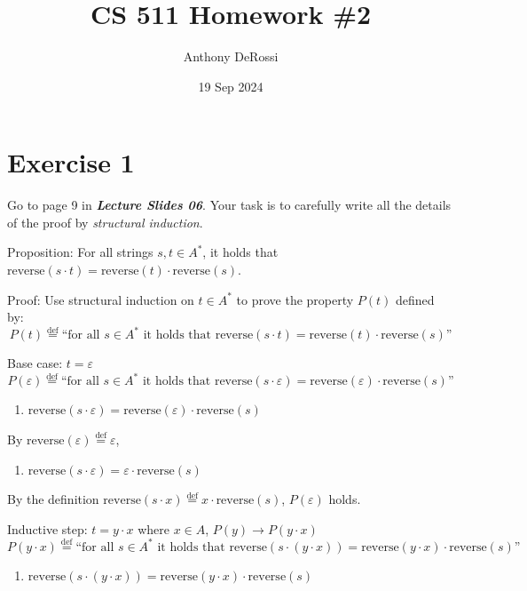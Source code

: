 \documentclass[12pt,leqno]{article}
\title{CS 511 Homework \#2}
\author{Anthony DeRossi}
\date{19 Sep 2024}
\newcommand{\DefEq}{\stackrel{\text{def}}{=}}
\begin{document}
\maketitle

\section*{Exercise 1}

Go to page 9 in \textbf{\textit{Lecture Slides 06}}. Your task is to carefully
write all the details of the proof by \textit{structural induction}.

\medskip
Proposition: For all strings $s, t \in A^*$, it holds that $\text{reverse}(s
\cdot t) = \text{reverse}(t) \cdot \text{reverse}(s)$.

Proof: Use structural induction on $t \in A^*$ to prove the property $P(t)$
defined by:
\[
  P(t) \DefEq \text{``for all $s \in A^*$ it holds that
    $\text{reverse}(s \cdot t) = \text{reverse}(t) \cdot \text{reverse}(s)$''}
\]

\medskip
Base case: $t = \varepsilon$
\[
  P(\varepsilon) \DefEq \text{``for all $s \in A^*$ it holds
    that $\text{reverse}(s \cdot \varepsilon) = \text{reverse}(\varepsilon)
    \cdot \text{reverse}(s)$''}
\]

\begin{enumerate}
\item $\text{reverse}(s \cdot \varepsilon) = \text{reverse}(\varepsilon)
  \cdot \text{reverse}(s)$
\end{enumerate}

By $\text{reverse}(\varepsilon) \DefEq \varepsilon$,

\begin{enumerate}[resume]
\item $\text{reverse}(s \cdot \varepsilon) = \varepsilon \cdot
  \text{reverse}(s)$
\end{enumerate}

By the definition $\text{reverse}(s \cdot x) \DefEq x \cdot
\text{reverse}(s)$, $P(\varepsilon)$ holds.

\newpage
Inductive step: $t = y \cdot x$ where $x \in A$, $P(y) \to P(y \cdot x)$
\[
  P(y \cdot x) \DefEq \text{``for all $s \in A^*$ it holds
    that $\text{reverse}(s \cdot (y \cdot x)) = \text{reverse}(y \cdot x)
    \cdot \text{reverse}(s)$''}
\]

\begin{enumerate}
\item $\text{reverse}(s \cdot (y \cdot x)) = \text{reverse}(y \cdot x)
  \cdot \text{reverse}(s)$
\end{enumerate}
\end{document}
